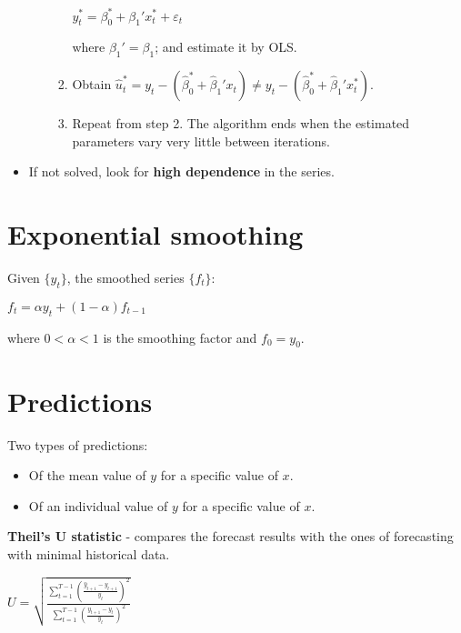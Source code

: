\documentclass[10pt, a4paper, landscape]{article}
\begin{document}
\begin{multicols}{3}
\begin{itemize}[leftmargin=*]
\begin{itemize}[leftmargin=*]
\begin{enumerate}[leftmargin=*]
\begin{center}
				\( y_{t}^{*} = \beta_{0}^{*} + \beta_{1}' x_{t}^{*} + \varepsilon_{t} \)
			\end{center}
			where \( \beta_{1}' = \beta_{1} \); and estimate it by OLS.
			\item Obtain \( \hat{u}_{t}^{*} = y_{t} - (\hat{\beta}_{0}^{*} + \hat{\beta}_{1}' x_{t}) \neq y_{t} - (\hat{\beta}_{0}^{*} + \hat{\beta}_{1}' x_{t}^{*}) \).
			\item Repeat from step 2. The algorithm ends when the estimated parameters vary very little between iterations.
		\end{enumerate}
	\end{itemize}
	\item If not solved, look for \textbf{high dependence} in the series.
\end{itemize}

\section*{Exponential smoothing}

Given \( \{ y_{t} \} \), the smoothed series \( \{ f_{t} \} \):

\begin{center}
	\( f_{t} = \alpha y_{t} + (1 - \alpha) f_{t - 1} \)
\end{center}

where \( 0 < \alpha < 1 \) is the smoothing factor and \( f_{0} = y_{0} \).

\section*{Predictions}

Two types of predictions:

\begin{itemize}[leftmargin=*]
	\item Of the mean value of \( y \) for a specific value of \( x \).
	\item Of an individual value of \( y \) for a specific value of \( x \).
\end{itemize}

\textbf{Theil's U statistic} - compares the forecast results with the ones of forecasting with minimal historical data.

\begin{center}
	\( U = \sqrt{\frac{\sum_{t = 1}^{T - 1} \left( \frac{\hat{y}_{t + 1} - y_{t + 1}}{y_{t}} \right)^{2}}{\sum_{t = 1}^{T - 1} \left( \frac{y_{t + 1} - y_{t}}{y_{t}} \right)^{2}}} \)
\end{center}


\end{multicols}
\end{document}
